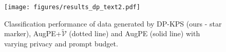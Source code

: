 
\begin{figure}[t]
    \begin{center}
        \texttt{[image: figures/results\_dp\_text2.pdf]}
        \caption{Classification performance of data generated by DP-KPS (ours - star marker), AugPE+$\widetilde{\mathcal{V}}$ (dotted line) and AugPE (solid line) with varying privacy and prompt budget.}%
        \label{fig:result_augpe_epsall}
    \end{center}
\end{figure}



